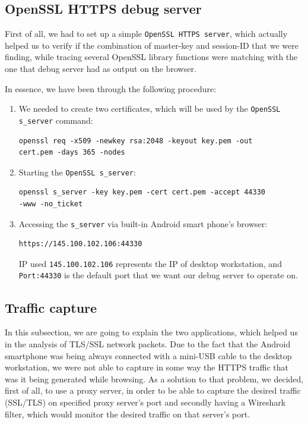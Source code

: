 \documentclass[12pt, a4paper]{report}
\begin{document}
\subsection{OpenSSL HTTPS debug server}

First of all, we had to set up a simple \texttt{OpenSSL HTTPS server}, which actually helped us to verify if the combination of master-key and session-ID that we were finding, while tracing several OpenSSL library functions were matching with the one that debug server had as output on the browser.

In essence, we have been through the following procedure:

\begin{enumerate}
\item We needed to create two certificates, which will be used by the \texttt{OpenSSL s\_server} command:
\begin{lstlisting}[frame=single, breaklines=true]
openssl req -x509 -newkey rsa:2048 -keyout key.pem -out
cert.pem -days 365 -nodes	
\end{lstlisting}	

\item Starting the \texttt{OpenSSL s\_server}:
\begin{lstlisting}[frame=single, breaklines=true]
openssl s_server -key key.pem -cert cert.pem -accept 44330
-www -no_ticket
\end{lstlisting}

\item Accessing the \texttt{s\_server} via built-in Android smart phone's browser:
\begin{lstlisting}[frame=single, breaklines=true]
https://145.100.102.106:44330
\end{lstlisting}
IP used \texttt{145.100.102.106} represents the IP of desktop workstation, and \texttt{Port:44330} is the default port that we want our debug server to operate on.  

\end{enumerate}

\subsection{Traffic capture}

In this subsection, we are going to explain the two applications, which helped us in the analysis of TLS/SSL network packets. Due to the fact that the Android smartphone was being always connected with a mini-USB cable to the desktop workstation, we were not able to capture in some way the HTTPS traffic that was it being generated while browsing. As a solution to that problem, we decided, first of all, to use a proxy server, in order to be able to capture the desired traffic (SSL/TLS) on specified proxy server's port and secondly having a Wireshark filter, which would monitor the desired traffic on that server's port. 
\end{document}
